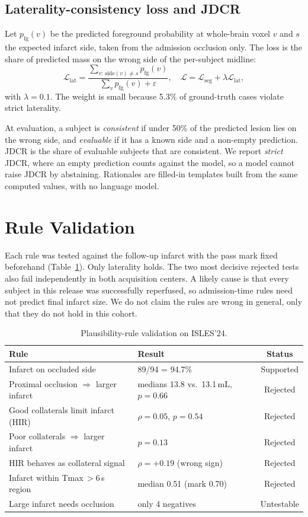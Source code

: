 \documentclass[conference]{IEEEtran}
\begin{document}
\subsection{Laterality-consistency loss and JDCR}
Let $p_{\text{fg}}(v)$ be the predicted foreground probability at whole-brain voxel $v$ and $s$ the expected infarct side, taken from the admission occlusion only. The loss is the share of predicted mass on the wrong side of the per-subject midline:
\begin{equation}
\mathcal{L}_{\text{lat}}=\frac{\sum_{v:\,\mathrm{side}(v)\neq s}p_{\text{fg}}(v)}{\sum_v p_{\text{fg}}(v)+\varepsilon},\quad
\mathcal{L}=\mathcal{L}_{\text{seg}}+\lambda\mathcal{L}_{\text{lat}},
\end{equation}
with $\lambda=0.1$. The weight is small because 5.3\% of ground-truth cases violate strict laterality.

At evaluation, a subject is \emph{consistent} if under 50\% of the predicted lesion lies on the wrong side, and \emph{evaluable} if it has a known side and a non-empty prediction. JDCR is the share of evaluable subjects that are consistent. We report \emph{strict} JDCR, where an empty prediction counts against the model, so a model cannot raise JDCR by abstaining. Rationales are filled-in templates built from the same computed values, with no language model.

\section{Rule Validation}
Each rule was tested against the follow-up infarct with the pass mark fixed beforehand (Table~\ref{tab:rules}). Only laterality holds. The two most decisive rejected tests also fail independently in both acquisition centers. A likely cause is that every subject in this release was successfully reperfused, so admission-time rules need not predict final infarct size. We do not claim the rules are wrong in general, only that they do not hold in this cohort.

\begin{table}[t]
\centering
\caption{Plausibility-rule validation on ISLES'24.}
\label{tab:rules}
\footnotesize
\begin{tabular}{p{3.6cm}p{3.3cm}c}
\toprule
\textbf{Rule} & \textbf{Result} & \textbf{Status} \\
\midrule
Infarct on occluded side & 89/94 = 94.7\% & Supported \\
Proximal occlusion $\Rightarrow$ larger infarct & medians 13.8 vs.\ 13.1\,mL, $p=0.66$ & Rejected \\
Good collaterals limit infarct (HIR) & $\rho=0.05$, $p=0.54$ & Rejected \\
Poor collaterals $\Rightarrow$ larger infarct & $p=0.13$ & Rejected \\
HIR behaves as collateral signal & $\rho=+0.19$ (wrong sign) & Rejected \\
Infarct within Tmax\,$>$6\,s region & median 0.51 (mark 0.70) & Rejected \\
Large infarct needs occlusion & only 4 negatives & Untestable \\
\bottomrule
\end{tabular}
\end{table}
\end{document}
